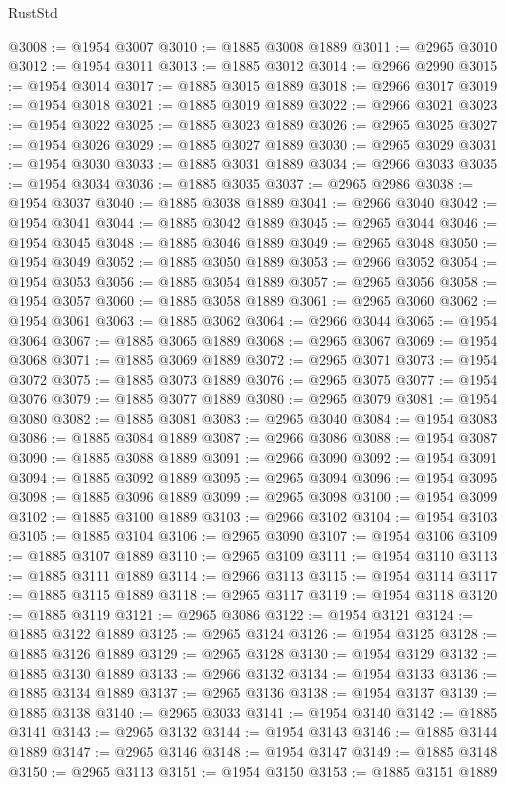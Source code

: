 \begin{lexlean}{RustStd}
\begin{coremodule}
@3008 := @1954 @3007
@3010 := @1885 @3008 @1889
@3011 := @2965 @3010
@3012 := @1954 @3011
@3013 := @1885 @3012
@3014 := @2966 @2990
@3015 := @1954 @3014
@3017 := @1885 @3015 @1889
@3018 := @2966 @3017
@3019 := @1954 @3018
@3021 := @1885 @3019 @1889
@3022 := @2966 @3021
@3023 := @1954 @3022
@3025 := @1885 @3023 @1889
@3026 := @2965 @3025
@3027 := @1954 @3026
@3029 := @1885 @3027 @1889
@3030 := @2965 @3029
@3031 := @1954 @3030
@3033 := @1885 @3031 @1889
@3034 := @2966 @3033
@3035 := @1954 @3034
@3036 := @1885 @3035
@3037 := @2965 @2986
@3038 := @1954 @3037
@3040 := @1885 @3038 @1889
@3041 := @2966 @3040
@3042 := @1954 @3041
@3044 := @1885 @3042 @1889
@3045 := @2965 @3044
@3046 := @1954 @3045
@3048 := @1885 @3046 @1889
@3049 := @2965 @3048
@3050 := @1954 @3049
@3052 := @1885 @3050 @1889
@3053 := @2966 @3052
@3054 := @1954 @3053
@3056 := @1885 @3054 @1889
@3057 := @2965 @3056
@3058 := @1954 @3057
@3060 := @1885 @3058 @1889
@3061 := @2965 @3060
@3062 := @1954 @3061
@3063 := @1885 @3062
@3064 := @2966 @3044
@3065 := @1954 @3064
@3067 := @1885 @3065 @1889
@3068 := @2965 @3067
@3069 := @1954 @3068
@3071 := @1885 @3069 @1889
@3072 := @2965 @3071
@3073 := @1954 @3072
@3075 := @1885 @3073 @1889
@3076 := @2965 @3075
@3077 := @1954 @3076
@3079 := @1885 @3077 @1889
@3080 := @2965 @3079
@3081 := @1954 @3080
@3082 := @1885 @3081
@3083 := @2965 @3040
@3084 := @1954 @3083
@3086 := @1885 @3084 @1889
@3087 := @2966 @3086
@3088 := @1954 @3087
@3090 := @1885 @3088 @1889
@3091 := @2966 @3090
@3092 := @1954 @3091
@3094 := @1885 @3092 @1889
@3095 := @2965 @3094
@3096 := @1954 @3095
@3098 := @1885 @3096 @1889
@3099 := @2965 @3098
@3100 := @1954 @3099
@3102 := @1885 @3100 @1889
@3103 := @2966 @3102
@3104 := @1954 @3103
@3105 := @1885 @3104
@3106 := @2965 @3090
@3107 := @1954 @3106
@3109 := @1885 @3107 @1889
@3110 := @2965 @3109
@3111 := @1954 @3110
@3113 := @1885 @3111 @1889
@3114 := @2966 @3113
@3115 := @1954 @3114
@3117 := @1885 @3115 @1889
@3118 := @2965 @3117
@3119 := @1954 @3118
@3120 := @1885 @3119
@3121 := @2965 @3086
@3122 := @1954 @3121
@3124 := @1885 @3122 @1889
@3125 := @2965 @3124
@3126 := @1954 @3125
@3128 := @1885 @3126 @1889
@3129 := @2965 @3128
@3130 := @1954 @3129
@3132 := @1885 @3130 @1889
@3133 := @2966 @3132
@3134 := @1954 @3133
@3136 := @1885 @3134 @1889
@3137 := @2965 @3136
@3138 := @1954 @3137
@3139 := @1885 @3138
@3140 := @2965 @3033
@3141 := @1954 @3140
@3142 := @1885 @3141
@3143 := @2965 @3132
@3144 := @1954 @3143
@3146 := @1885 @3144 @1889
@3147 := @2965 @3146
@3148 := @1954 @3147
@3149 := @1885 @3148
@3150 := @2965 @3113
@3151 := @1954 @3150
@3153 := @1885 @3151 @1889

\end{coremodule}
\end{lexlean}
